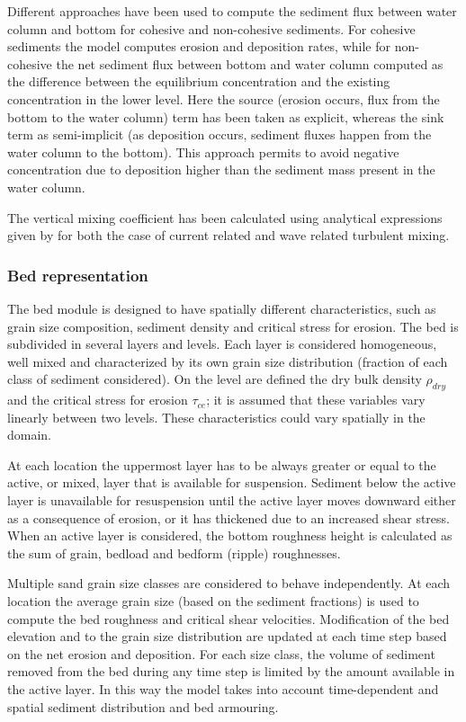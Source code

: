 Different approaches have been used to compute the sediment flux 
between water column and bottom for cohesive and non-cohesive sediments.
For cohesive sediments the model computes erosion and deposition rates,
while for non-cohesive the net sediment flux between bottom and water 
column computed as the difference between the equilibrium
concentration and the existing concentration in the lower level.
Here the source (erosion occurs, flux from the bottom to the water 
column) term has been taken as explicit, whereas the sink term as 
semi-implicit (as deposition occurs, sediment fluxes happen from 
the water column to the bottom).
This approach permits to avoid negative concentration 
due to deposition higher than the sediment mass present in the water 
column.

The vertical mixing coefficient has been calculated  using analytical
expressions given by \cite{vanrijn93:prin} for both the case of current
related and wave related turbulent mixing.

\subsubsection{Bed representation}
The bed module is designed to have spatially different characteristics, such 
as grain size composition, sediment density and critical stress for erosion.
The bed is subdivided in several layers and levels. Each layer is considered
homogeneous, well mixed and characterized by its own grain size distribution
(fraction of each class of sediment considered). On the level are defined
the dry bulk density $\rho_{dry}$ and the critical stress for erosion
$\tau_{ce}$; it is assumed that these variables vary linearly between two
levels. These characteristics could vary spatially in the domain.

At each location the uppermost layer has to be always greater or equal to
the active, or mixed, layer that is available for suspension.
Sediment below the active layer is unavailable for resuspension until the 
active layer moves downward either as a consequence of erosion, or it 
has thickened due to an increased shear stress. When an active layer is considered,
the bottom roughness height is calculated as the sum of grain, bedload and bedform (ripple) roughnesses.

Multiple sand grain size classes are considered to behave independently. At
each location the average grain size (based on the sediment fractions) is
used to compute the bed roughness and critical shear velocities.
Modification of the bed elevation and to the grain size distribution are
updated at each time step based on the net erosion and deposition.
For each size class, the volume of sediment removed from the bed during any
time step is limited by the amount available in the active layer. In this
way the model takes into account time-dependent and spatial sediment
distribution and bed armouring.

